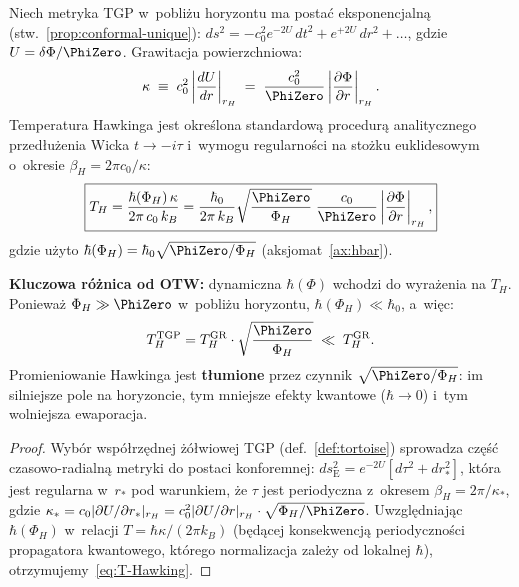 \begin{proposition}\label{prop:T-Hawking}
Niech metryka TGP w~pobli\.zu horyzontu ma posta\'c
eksponencjaln\k{a} (stw.~\ref{prop:conformal-unique}):
$ds^2 = -c_0^2 e^{-2U}\,dt^2 + e^{+2U}\,dr^2 + \ldots$,
gdzie $U = \delta\Phi/\PhiZero$. Grawitacja powierzchniowa:
\begin{equation}\label{eq:surface-gravity}
    \kappa \;\equiv\; c_0^2\left|\frac{dU}{dr}\right|_{r_H}
    \;=\; \frac{c_0^2}{\PhiZero}
      \left|\frac{\partial\Phi}{\partial r}\right|_{r_H}.
\end{equation}
Temperatura Hawkinga jest okre\'slona standardow\k{a}
procedur\k{a} analitycznego przed\l{}u\.zenia Wicka
$t \to -i\tau$ i~wymogu regularno\'sci na sto\.zku
euklidesowym o~okresie $\beta_H = 2\pi c_0/\kappa$:
\begin{equation}\label{eq:T-Hawking}
    \boxed{
      T_H = \frac{\hbar(\Phi_H)\,\kappa}{2\pi\,c_0\,k_B}
      = \frac{\hbar_0}{2\pi\,k_B}
        \sqrt{\frac{\PhiZero}{\Phi_H}}
        \;\frac{c_0}{\PhiZero}
        \left|\frac{\partial\Phi}{\partial r}\right|_{r_H},
    }
\end{equation}
gdzie u\.zyto $\hbar(\Phi_H) = \hbar_0\sqrt{\PhiZero/\Phi_H}$
(aksjomat~\ref{ax:hbar}).

\medskip\noindent
\textbf{Kluczowa r\'o\.znica od OTW:} dynamiczna $\hbar(\Phi)$
wchodzi do wyra\.zenia na $T_H$. Poniewa\.z $\Phi_H \gg \PhiZero$
w~pobli\.zu horyzontu, $\hbar(\Phi_H) \ll \hbar_0$, a~wi\k{e}c:
\begin{equation}\label{eq:T-H-suppression}
    T_H^{\mathrm{TGP}} = T_H^{\mathrm{GR}}
      \cdot \sqrt{\frac{\PhiZero}{\Phi_H}}
    \;\ll\; T_H^{\mathrm{GR}}.
\end{equation}
Promieniowanie Hawkinga jest \textbf{t\l{}umione} przez czynnik
$\sqrt{\PhiZero/\Phi_H}$: im silniejsze pole na horyzoncie, tym
mniejsze efekty kwantowe ($\hbar \to 0$) i~tym wolniejsza
ewaporacja.
\end{proposition}

\begin{proof}
Wyb\'or wsp\'o\l{}rz\k{e}dnej \.z\'o\l{}wiowej TGP
(def.~\ref{def:tortoise}) sprowadza cz\k{e}\'s\'c czasowo-radialn\k{a}
metryki do postaci konforemnej:
$ds^2_{\mathrm{E}} = e^{-2U}[d\tau^2 + dr_*^2]$,
kt\'ora jest regularna w~$r_*$ pod warunkiem, \.ze $\tau$
jest periodyczna z~okresem $\beta_H = 2\pi/\kappa_*$,
gdzie $\kappa_* = c_0|\partial U/\partial r_*|_{r_H}
= c_0^2|\partial U/\partial r|_{r_H} \cdot \sqrt{\Phi_H/\PhiZero}$.
Uwzgl\k{e}dniaj\k{a}c $\hbar(\Phi_H)$ w~relacji $T = \hbar\kappa/(2\pi k_B)$
(b\k{e}d\k{a}cej konsekwencj\k{a} periodyczno\'sci propagatora
kwantowego, kt\'orego normalizacja zale\.zy od lokalnej $\hbar$),
otrzymujemy~\eqref{eq:T-Hawking}.
\end{proof}

